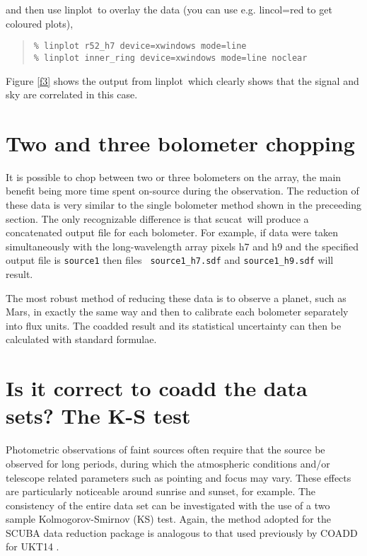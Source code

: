 \documentclass[twoside,11pt,fleqn]{article}
\newenvironment{myquote}{\begin{quote}\begin{small}}{\end{small}\end{quote}}
\newcommand{\task}[1]{{\sf #1}}
\newcommand{\scucat}{\xref{\task{scucat}}{sun216}{SCUCAT}}
\newcommand{\linplot}{\xref{\task{linplot}}{sun95}{LINPLOT}}
\newcommand{\xref}[3]{#1}
\newcommand{\xlabel}[1]{}
\begin{document}
and then use \linplot\ to overlay the data (you can use
e.g. lincol=red to get coloured plots),

\begin{myquote}
\begin{verbatim}
% linplot r52_h7 device=xwindows mode=line
% linplot inner_ring device=xwindows mode=line noclear
\end{verbatim}
\end{myquote}

Figure \ref{f3} shows the output from \linplot\ which clearly shows that
the signal and sky are correlated in this case.

\section{\xlabel{twobol}Two and three bolometer chopping\label{twobol}}

It is possible to chop between two or three bolometers on the array,
the main benefit being more time spent on-source during the
observation. The reduction of these data is very similar to the single
bolometer method shown in the preceeding section. The only
recognizable difference is that \scucat\ will produce a
concatenated output file for each bolometer. For example, if data were
taken simultaneously with the long-wavelength array pixels h7 and h9
and the specified output file is {\tt source1} then files {\tt
source1\_h7.sdf} and {\tt source1\_h9.sdf} will result.

The most robust method of reducing these data is to observe a planet,
such as Mars, in exactly the same way and then to calibrate each
bolometer separately into flux units. The coadded result and its
statistical uncertainty can then be calculated with standard formulae.

\section{Is it correct to coadd the data sets? The K-S test}

Photometric observations of faint sources often require that the
source be observed for long periods, during which the atmospheric
conditions and/or telescope related parameters such as pointing and
focus may vary. These effects are particularly noticeable around
sunrise and sunset, for example. The consistency of the entire data
set can be investigated with the use of a two sample
Kolmogorov-Smirnov (KS) test. Again, the method adopted for the SCUBA
data reduction package is analogous to that used previously by COADD
for UKT14 \cite{dhh}.
\end{document}
